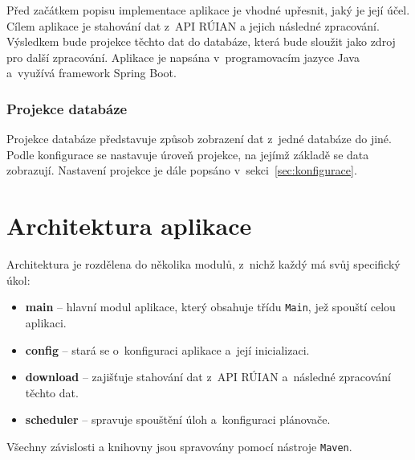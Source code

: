 Před začátkem popisu implementace aplikace je vhodné upřesnit, jaký je její účel.  
Cílem aplikace je stahování dat z~API RÚIAN a jejich následné zpracování.  
Výsledkem bude projekce těchto dat do databáze, která bude sloužit jako zdroj pro další zpracování.  
Aplikace je napsána v~programovacím jazyce Java a~využívá framework Spring Boot.

\subsubsection*{Projekce databáze}
Projekce databáze představuje způsob zobrazení dat z~jedné databáze do jiné.  
Podle konfigurace se nastavuje úroveň projekce, na jejímž základě se data zobrazují.  
Nastavení projekce je dále popsáno v~sekci~\ref{sec:konfigurace}.

\section{Architektura aplikace}
Architektura je rozdělena do několika modulů, z~nichž každý má svůj specifický úkol:
\begin{itemize}[itemsep=0pt]
    \item \textbf{main} -- hlavní modul aplikace, který obsahuje třídu \texttt{Main}, jež spouští celou aplikaci.
    \item \textbf{config} -- stará se o~konfiguraci aplikace a~její inicializaci.
    \item \textbf{download} -- zajišťuje stahování dat z~API RÚIAN a~následné zpracování těchto dat.
    \item \textbf{scheduler} -- spravuje spouštění úloh a~konfiguraci plánovače.
\end{itemize}
Všechny závislosti a knihovny jsou spravovány pomocí nástroje \texttt{Maven}.